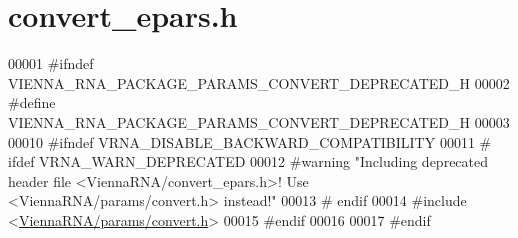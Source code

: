 \hypertarget{convert__epars_8h_source}{}\section{convert\+\_\+epars.\+h}
\label{convert__epars_8h_source}

\begin{DoxyCode}
00001 \textcolor{preprocessor}{#ifndef VIENNA\_RNA\_PACKAGE\_PARAMS\_CONVERT\_DEPRECATED\_H}
00002 \textcolor{preprocessor}{#define VIENNA\_RNA\_PACKAGE\_PARAMS\_CONVERT\_DEPRECATED\_H}
00003 
00010 \textcolor{preprocessor}{#ifndef VRNA\_DISABLE\_BACKWARD\_COMPATIBILITY}
00011 \textcolor{preprocessor}{# ifdef VRNA\_WARN\_DEPRECATED}
00012 \textcolor{preprocessor}{#warning "Including deprecated header file <ViennaRNA/convert\_epars.h>! Use <ViennaRNA/params/convert.h>
       instead!"}
00013 \textcolor{preprocessor}{# endif}
00014 \textcolor{preprocessor}{#include <\hyperlink{convert_8h}{ViennaRNA/params/convert.h}>}
00015 \textcolor{preprocessor}{#endif}
00016 
00017 \textcolor{preprocessor}{#endif}
\end{DoxyCode}
